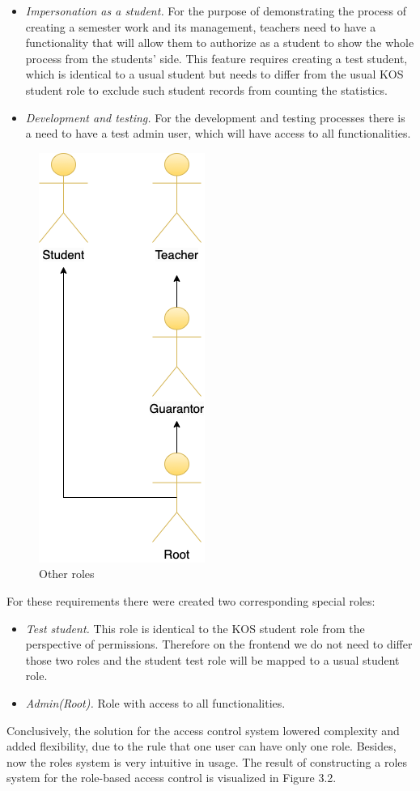 \begin{itemize}
    \item \emph{Impersonation as a student.} For the purpose of demonstrating the process of creating a semester work and its management, teachers need to have a functionality that will allow them to authorize as a student to show the whole process from the students' side. This feature requires creating a test student, which is identical to a usual student but needs  to differ from the usual KOS student role to exclude such student records from counting the statistics. 
    \item \emph{Development and testing.} For the development and testing processes there is a need to have a test admin user, which will have access to all functionalities. 
\end{itemize}

\begin{figure}[h]
\centering
\includegraphics[scale=0.54]{../png/roles.png}
\caption{Other roles}\label{picture:special_roles}
\end{figure}


\noindent For these requirements there were created two corresponding special roles:

\begin{itemize}
    \item \emph{Test student.} This role is identical to the KOS student role from the perspective of permissions. Therefore on the frontend we do not need to differ those two roles and the student test role will be mapped to a usual student role.
    \item \emph{Admin(Root).} Role with access to all functionalities.
\end{itemize}

\noindent Conclusively, the solution for the access control system lowered complexity and added flexibility, due to the rule that one user can have only one role. Besides, now the roles system is very intuitive in usage. The result of constructing a roles system for the role-based access control is visualized in Figure 3.2.
